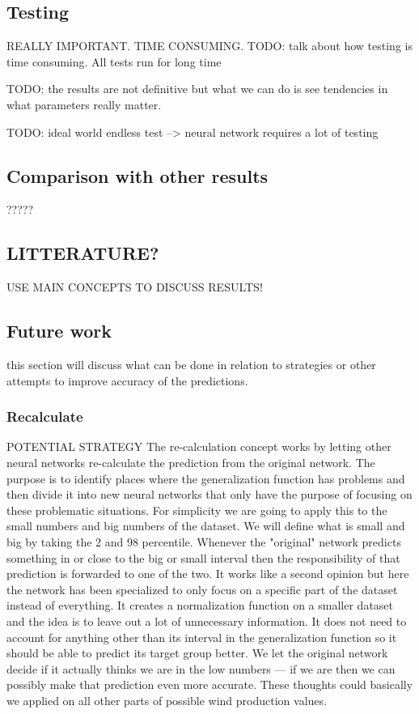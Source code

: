 \subsection{Testing}
REALLY IMPORTANT. TIME CONSUMING.
TODO: talk about how testing is time consuming. All tests run for long time

TODO: the results are not definitive but what we can do is see tendencies in what parameters really matter.

TODO: ideal world endless test --> neural network requires a lot of testing


\subsection{Comparison with other results}
?????

\subsection{LITTERATURE?}
USE MAIN CONCEPTS TO DISCUSS RESULTS!

\subsection{Future work}
this section will discuss what can be done in relation to strategies or other attempts to improve accuracy of the predictions.

\subsubsection{Recalculate}
POTENTIAL STRATEGY
The re-calculation concept works by letting other neural networks re-calculate the prediction from the original network. The purpose is to identify places where the generalization function has problems and then divide it into new neural networks that only have the purpose of focusing on these problematic situations. For simplicity we are going to apply this to the small numbers and big numbers of the dataset. We will define what is small and big by taking the 2 and 98 percentile. Whenever the "original" network predicts something in or close to the big or small interval then the responsibility of that prediction is forwarded to one of the two. It works like a second opinion but here the network has been specialized to only focus on a specific part of the dataset instead of everything. It creates a normalization function on a smaller dataset and the idea is to leave out a lot of unnecessary information. It does not need to account for anything other than its interval in the generalization function so it should be able to predict its target group better. We let the original network decide if it actually thinks we are in the low numbers --- if we are then we can possibly make that prediction even more accurate. These thoughts could basically we applied on all other parts of possible wind production values. 

